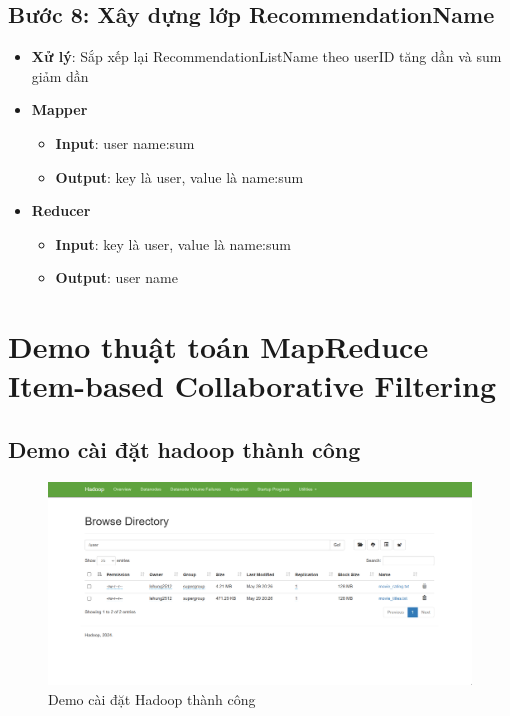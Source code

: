 \subsection*{Bước 8: Xây dựng lớp RecommendationName}
\begin{itemize}
    \item \textbf{Xử lý}: Sắp xếp lại RecommendationListName theo userID tăng dần và sum giảm dần
    \item \textbf{Mapper}
          \begin{itemize}
              \item \textbf{Input}: user \quad name:sum \\
              \item \textbf{Output}: key là user, value là name:sum \\
          \end{itemize}
    \item \textbf{Reducer}
          \begin{itemize}
              \item \textbf{Input}: key là user, value là name:sum \\
              \item \textbf{Output}: user \quad name \\
          \end{itemize}
\end{itemize}

\pagebreak
\section{Demo thuật toán MapReduce Item-based Collaborative Filtering}
\subsection*{Demo cài đặt hadoop thành công}
\begin{figure}[h]
    \centering
    \includegraphics[width=12cm]{images/Demo1.png}
    \caption{Demo cài đặt Hadoop thành công}
\end{figure}
